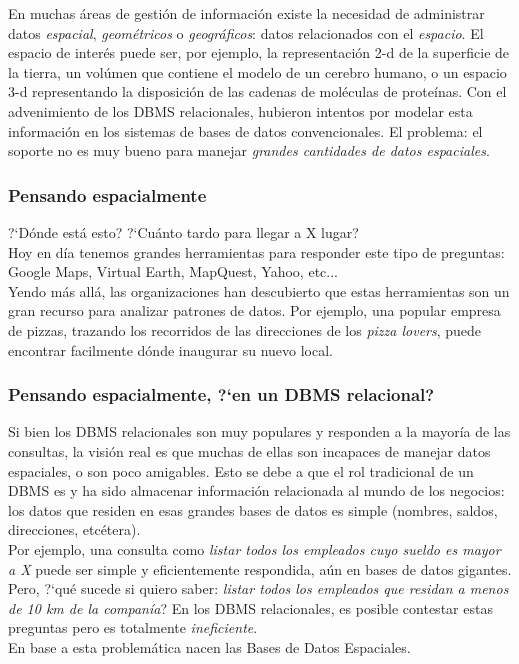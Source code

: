 \documentclass[a4paper,12pt,oneside]{report}
\begin{document}
En muchas \'areas de gesti\'on de informaci\'on existe la necesidad de administrar datos \textit{espacial}, \textit{geom\'etricos} o \textit{geogr\'aficos}: datos relacionados con el \textit{espacio}. El espacio de inter\'es puede ser, por ejemplo, la representaci\'on 2-d de la superficie de la tierra, un vol\'umen que contiene el modelo de un cerebro humano, o un espacio 3-d representando la disposici\'on de las cadenas de mol\'eculas de prote\'inas.
Con el advenimiento de los DBMS relacionales, hubieron intentos por modelar esta informaci\'on en los sistemas de bases de datos convencionales. El problema: el soporte no es muy bueno para manejar \textit{grandes cantidades de datos espaciales}.

\subsubsection*{Pensando espacialmente}
?`D\'onde est\'a esto? ?`Cu\'anto tardo para llegar a X lugar?\\
Hoy en d\'ia tenemos grandes herramientas para responder este tipo de preguntas: Google Maps, Virtual Earth, MapQuest, Yahoo, etc...\\
Yendo m\'as all\'a, las organizaciones han descubierto que estas herramientas son un gran recurso para analizar patrones de datos.
Por ejemplo, una popular empresa de pizzas, trazando los recorridos de las direcciones de los \textit{pizza lovers}, puede encontrar facilmente d\'onde inaugurar su nuevo local.
\subsubsection*{Pensando espacialmente, ?`en un DBMS relacional?}
Si bien los DBMS relacionales son muy populares y responden a la mayor\'ia de las consultas, la visi\'on real es que muchas de ellas son incapaces de manejar datos espaciales, o son poco amigables. Esto se debe a que el rol tradicional de un DBMS es y ha sido almacenar informaci\'on relacionada al mundo de los negocios: los datos que residen en esas grandes bases de datos es simple (nombres, saldos, direcciones, etc\'etera).\\
Por ejemplo, una consulta como \textit{listar todos los empleados cuyo sueldo es mayor a X} puede ser simple y eficientemente respondida, a\'un en bases de datos gigantes. Pero, ?`qu\'e sucede si quiero saber: \textit{listar todos los empleados que residan a menos de 10 km de la compan\'ia}? En los DBMS relacionales, es posible contestar estas preguntas pero es totalmente \textit{ineficiente}.\\
En base a esta problem\'atica nacen las Bases de Datos Espaciales.
\end{document}
